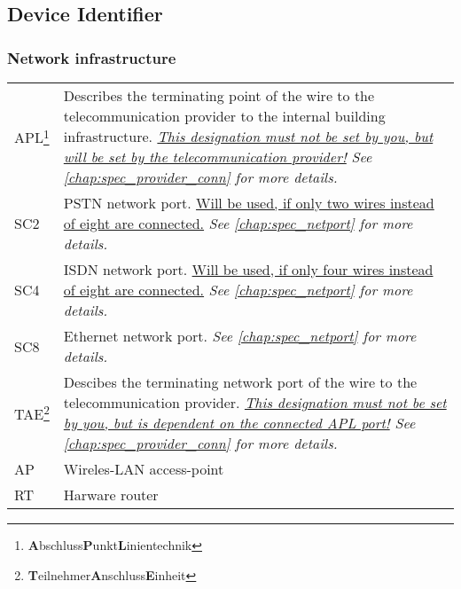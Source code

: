 %
%
%
%
%
%
%

\subsection{Device Identifier}
\label{chap:con_dev-identify}


\subsubsection{Network infrastructure}

\renewcommand{\arraystretch}{1.2}
\begin{savenotes}
\begin{tabular}{p{1.4cm}p{15cm}}
	APL\footnote{\textbf{A}bschluss\textbf{P}unkt\textbf{L}inientechnik} & Describes
		the terminating point of the wire to the telecommunication provider to
		the internal building infrastructure. \textit{\underline{This
		designation must not be set by you, but will be set by the
		telecommunication provider!} See \ref{chap:spec_provider_conn} for more
		details.} \\

	SC2 & PSTN network port. \underline{Will be used, if only two wires instead
		of eight are connected.} \textit{See \ref{chap:spec_netport} for more
		details.} \\

	SC4 & ISDN network port. \underline{Will be used, if only four wires instead
		of eight are connected.} \textit{See \ref{chap:spec_netport} for more
		details.} \\

	SC8 & Ethernet network port. \textit{See \ref{chap:spec_netport} for more
		details.} \\

	TAE\footnote{\textbf{T}eilnehmer\textbf{A}nschluss\textbf{E}inheit} & Descibes
		the terminating network port of the wire to the telecommunication
		provider. \textit{\underline{This designation must not be set by you,
		but is dependent on the connected APL port!} See
		\ref{chap:spec_provider_conn} for more details.} \\

	AP	& Wireles-LAN access-point \\

	RT	& Harware router \\
\end{tabular}
\end{savenotes}


